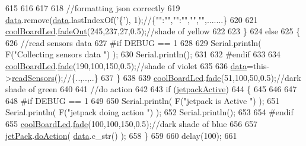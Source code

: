 \begin{DoxyCode}
615 
616         
617 
618         \textcolor{comment}{//formatting json correctly}
619         \hyperlink{class_cool_board_a427fb753dd8575bdf821c70a5c63d695}{data}.remove(\hyperlink{class_cool_board_a427fb753dd8575bdf821c70a5c63d695}{data}.lastIndexOf(\textcolor{charliteral}{'\{'}), 1);\textcolor{comment}{//\{"":"","":"","","",.......\}}
620 
621         \hyperlink{class_cool_board_a1b1d3c684a5baa56b08486e192fd8e97}{coolBoardLed}.\hyperlink{class_cool_board_led_a93d545679237e8cc858324367149775c}{fadeOut}(245,237,27,0.5);\textcolor{comment}{//shade of yellow}
622                 
623     \}   
624     \textcolor{keywordflow}{else}
625     \{
626         \textcolor{comment}{//read sensors data}
627 \textcolor{preprocessor}{    #if DEBUG == 1}
628 
629         Serial.println( F(\textcolor{stringliteral}{"Collecting sensors data "}) );
630         Serial.println();
631 
632 \textcolor{preprocessor}{    #endif}
633 
634         \hyperlink{class_cool_board_a1b1d3c684a5baa56b08486e192fd8e97}{coolBoardLed}.\hyperlink{class_cool_board_led_af1cacbaa88db8bcf6042c1083ba41155}{fade}(190,100,150,0.5);\textcolor{comment}{//shade of violet        }
635 
636         \hyperlink{class_cool_board_a427fb753dd8575bdf821c70a5c63d695}{data}=this->\hyperlink{class_cool_board_ad03abdce2e65f520bbf2cff0f2d083cf}{readSensors}();\textcolor{comment}{//\{..,..,..\}}
637     \}
638 
639     \hyperlink{class_cool_board_a1b1d3c684a5baa56b08486e192fd8e97}{coolBoardLed}.\hyperlink{class_cool_board_led_af1cacbaa88db8bcf6042c1083ba41155}{fade}(51,100,50,0.5);\textcolor{comment}{//dark shade of green  }
640 
641     \textcolor{comment}{//do action}
642 
643     \textcolor{keywordflow}{if} (\hyperlink{class_cool_board_a9be03a913d26e558328935ca3b59a75e}{jetpackActive})
644     \{
645     
646 
647 
648 \textcolor{preprocessor}{    #if DEBUG == 1}
649 
650         Serial.println( F(\textcolor{stringliteral}{"jetpack is Active "}) );
651         Serial.println( F(\textcolor{stringliteral}{"jetpack doing action "}) );
652         Serial.println();
653     
654 \textcolor{preprocessor}{    #endif}
655         \hyperlink{class_cool_board_a1b1d3c684a5baa56b08486e192fd8e97}{coolBoardLed}.\hyperlink{class_cool_board_led_af1cacbaa88db8bcf6042c1083ba41155}{fade}(100,100,150,0.5);\textcolor{comment}{//dark shade of blue }
656     
657         \hyperlink{class_cool_board_a30b1357881b01ccbec676856a91e48e9}{jetPack}.\hyperlink{class_jetpack_a9e703197093094b963f9ad57817495b8}{doAction}( \hyperlink{class_cool_board_a427fb753dd8575bdf821c70a5c63d695}{data}.c\_str() );
658     \}
659     
660     delay(100);
661 

\end{DoxyCode}
